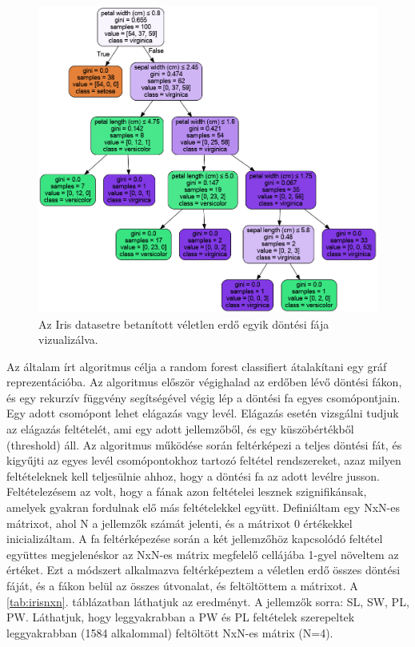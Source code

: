 \begin{figure}[ht]
	\centering
	\includegraphics[width=0.9\columnwidth]{figures/network_iris_tree.png}
	\caption{Az Iris datasetre betanított véletlen erdő egyik döntési fája
	vizualizálva.}
\end{figure}

Az általam írt algoritmus célja a random forest classifiert átalakítani egy gráf reprezentációba. Az algoritmus először végighalad az erdőben lévő döntési fákon, és egy rekurzív függvény segítségével végig lép a döntési fa egyes csomópontjain. Egy adott csomópont lehet elágazás vagy levél. Elágazás esetén vizsgálni tudjuk az elágazás feltételét, ami egy adott jellemzőből, és egy küszöbértékből (threshold) áll. Az algoritmus működése során feltérképezi a teljes döntési fát, és kigyűjti az egyes levél csomópontokhoz tartozó feltétel rendszereket, azaz milyen feltételeknek kell teljesülnie ahhoz, hogy a döntési fa az adott levélre jusson. Feltételezésem az volt, hogy a fának azon feltételei lesznek szignifikánsak, amelyek gyakran fordulnak elő más feltételekkel együtt. Definiáltam egy NxN-es mátrixot, ahol N a jellemzők számát jelenti, és a mátrixot 0 értékekkel inicializáltam. A fa feltérképezése során a két jellemzőhöz kapcsolódó feltétel együttes megjelenéskor az NxN-es mátrix megfelelő cellájába 1-gyel növeltem az értéket. Ezt a módszert alkalmazva feltérképeztem a véletlen erdő összes döntési fáját, és a fákon belül az összes útvonalat, és feltöltöttem a mátrixot. A \ref{tab:irisnxn}. táblázatban láthatjuk az eredményt. A jellemzők sorra: SL, SW, PL, PW\@. Láthatjuk, hogy leggyakrabban a PW és PL feltételek szerepeltek leggyakrabban (1584 alkalommal) feltöltött NxN-es mátrix (N=4). 

